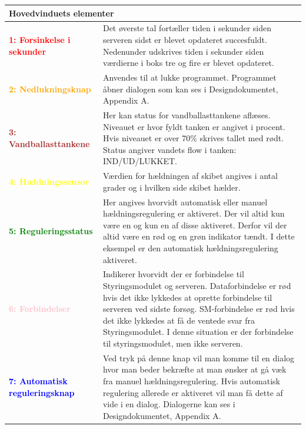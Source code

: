 \begin{table}[H]
\begin{center}

\begin{tabular}{| l | p{9.5cm} | }

\multicolumn{2}{l}{Hovedvinduets elementer} \\
\hline
\textcolor{red}{\textbf{1: Forsinkelse i sekunder}}
&Det øverste tal fortæller tiden i sekunder siden serveren sidst er blevet opdateret succesfuldt.
Nedenunder udskrives tiden i sekunder siden værdierne i boks tre og fire er blevet opdateret.\\\hline

\textcolor{Orange}{\textbf{2: Nedlukningsknap}}
&Anvendes til at lukke programmet. Programmet åbner dialogen som kan ses i Designdokumentet, Appendix A.\\\hline

\textcolor{brown}{\textbf{3: Vandballasttankene}}
&Her kan status for vandballasttankene aflæses. Niveauet er hvor fyldt tanken er angivet i procent. Hvis niveauet er over 70\% skrives tallet med rødt.
Status angiver vandets flow i tanken: IND/UD/LUKKET.\\\hline

\textcolor{yellow}{\textbf{4: Hældningssensor}}
&Værdien for hældningen af skibet angives i antal grader og i hvilken side skibet hælder.\\\hline

\textcolor{green}{\textbf{5: Reguleringsstatus}}
&Her angives hvorvidt automatisk eller manuel hældningsregulering er aktiveret. Der vil altid kun være en og kun en af disse aktiveret. Derfor vil der altid være en rød og en grøn indikator tændt. I dette eksempel er den automatisk hældningsregulering aktiveret.\\\hline

\textcolor{pink}{\textbf{6: Forbindelser}}
&Indikerer hvorvidt der er forbindelse til Styringsmodulet og serveren. Dataforbindelse er rød hvis det ikke lykkedes at oprette forbindelse til serveren ved sidste forsøg.
SM-forbindelse er rød hvis det ikke lykkedes at få de ventede svar fra Styringsmodulet.
I denne situation er der forbindelse til styringsmodulet, men ikke serveren.\\\hline

\textcolor{blue}{\textbf{7: Automatisk reguleringsknap}}
&Ved tryk på denne knap vil man komme til en dialog hvor man beder bekræfte at man ønsker at gå væk fra manuel hældningsregulering. Hvis automatisk regulering allerede er aktiveret vil man få dette af vide i en dialog. Dialogerne kan ses i Designdokumentet, Appendix A.\\\hline


\end{tabular}
\end{center}
\end{table}
